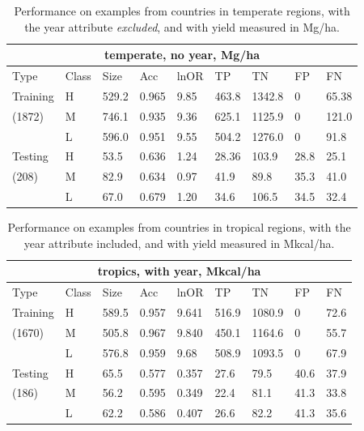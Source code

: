 \documentclass[11pt]{article}
\begin{document}
\begin{table}[h!]
\centering
\begin{tabular}{lllllllll}
\toprule
\multicolumn{9}{c}{\textbf{temperate, no year, Mg/ha}} \\
\midrule
Type & Class & Size & Acc & lnOR & TP & TN & FP & FN \\
\midrule
Training & H & 529.2 & 0.965 & 9.85 & 463.8 & 1342.8 & 0 & 65.38  \\
(1872) & M & 746.1 & 0.935 & 9.36 & 625.1 & 1125.9 & 0 & 121.0  \\
& L & 596.0 & 0.951 & 9.55 & 504.2 & 1276.0 & 0 & 91.8  \\
Testing & H & 53.5 & 0.636 & 1.24 & 28.36 & 103.9 & 28.8 & 25.1  \\
(208) & M & 82.9 & 0.634 & 0.97 & 41.9 & 89.8 & 35.3 & 41.0  \\
& L & 67.0 & 0.679 & 1.20 & 34.6 & 106.5 & 34.5 & 32.4  \\
\bottomrule
\end{tabular}
\caption{Performance on examples from countries in temperate regions, with the year attribute \emph{excluded}, and with yield measured in Mg/ha.}
\label{t.ny.temp_results}
\end{table}

\begin{table}[h!]
\centering
\begin{tabular}{lllllllll}
\toprule
\multicolumn{9}{c}{\textbf{tropics, with year, Mkcal/ha}} \\
\midrule
Type & Class & Size & Acc & lnOR & TP & TN & FP & FN \\
\midrule
Training & H & 589.5 & 0.957 & 9.641 & 516.9 & 1080.9 & 0 & 72.6  \\
(1670) & M & 505.8 & 0.967 & 9.840 & 450.1 & 1164.6 & 0 & 55.7  \\
& L & 576.8 & 0.959 & 9.68 & 508.9 & 1093.5 & 0 & 67.9  \\
Testing & H & 65.5 & 0.577 & 0.357 & 27.6 & 79.5 & 40.6 & 37.9  \\
(186) & M & 56.2 & 0.595 & 0.349 & 22.4 & 81.1 & 41.3 & 33.8  \\
& L & 62.2 & 0.586 & 0.407 & 26.6 & 82.2 & 41.3 & 35.6  \\
\bottomrule
\end{tabular}
\caption{Performance on examples from countries in tropical regions, with the year attribute included, and with yield measured in Mkcal/ha.}
\label{k.wy.trop_results}
\end{table}
\end{document}
